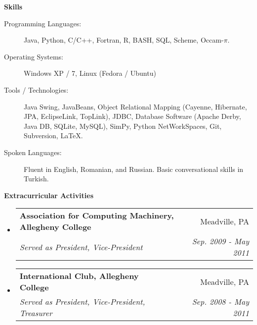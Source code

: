 \documentclass[letterpaper,12pt]{article}
\makeatletter
\newcommand{\resheading}[1]{{\large \colorbox{mygrey}{\begin{minipage}{\textwidth}{\textbf{#1 \vphantom{p\^{E}}}}\end{minipage}}}}
\newcommand{\ressubheading}[4]{
\begin{tabular*}{7.0in}{l@{\extracolsep{\fill}}r}
		\textbf{#1} & #2 \\
		\textit{#3} & \textit{#4} \\
\end{tabular*}\vspace{-6pt}}
\makeatother
\begin{document}
\pagebreak

\resheading{Skills}

\begin{description}
\item[Programming Languages:]
Java, Python, C/C++, Fortran, R, BASH, SQL, Scheme, Occam-$\pi$.
\item[Operating Systems:]
Windows XP / 7, Linux (Fedora / Ubuntu)
\item[Tools / Technologies:]
Java Swing, JavaBeans, Object Relational Mapping (Cayenne, Hibernate, JPA, EclipseLink, TopLink), JDBC, Database Software (Apache Derby, Java DB, SQLite, MySQL), SimPy, Python NetWorkSpaces, Git, Subversion, \LaTeX{}.
\item[Spoken Languages:]
Fluent in English, Romanian, and Russian. Basic conversational skills in Turkish.
\end{description}

\resheading{Extracurricular Activities}
\begin{itemize}
\item
	\ressubheading{Association for Computing Machinery, Allegheny College}{Meadville, PA}{Served as President, Vice-President}{Sep. 2009 - May 2011}
\item
	\ressubheading{International Club, Allegheny College}{Meadville, PA}{Served as President, Vice-President, Treasurer}{Sep. 2008 - May 2011}
\end{itemize}
\end{document}
